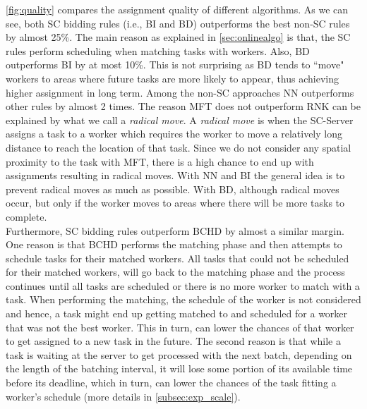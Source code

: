 \cref{fig:quality} compares the assignment quality of different algorithms. As we can see, both SC bidding rules (i.e., BI and BD) outperforms the best non-SC rules by almost 25\%. The main reason as explained in \cref{sec:onlinealgo} is that, the SC rules perform scheduling when matching tasks with workers. Also, BD outperforms BI by at most 10\%. This is not surprising as BD tends to ``move" workers to areas where future tasks are more likely to appear, thus achieving higher assignment in long term. Among the non-SC approaches NN outperforms other rules by almost 2 times. The reason MFT does not outperform RNK can be explained by what we call a \emph{radical move}. A \emph{radical move} is when the SC-Server assigns a task to a worker which requires the worker to move a relatively long distance to reach the location of that task. Since we do not consider any spatial proximity to the task with MFT, there is a high chance to end up with assignments resulting in radical moves. With NN and BI the general idea is to prevent radical moves as much as possible. With BD, although radical moves occur, but only if the worker moves to areas where there will be more tasks to complete.\\

Furthermore, SC bidding rules outperform BCHD by almost a similar margin. One reason is that BCHD performs the matching phase and then attempts to schedule tasks for their matched workers. All tasks that could not be scheduled for their matched workers, will go back to the matching phase and the process continues until all tasks are scheduled or there is no more worker to match with a task. When performing the matching, the schedule of the worker is not considered and hence, a task might end up getting matched to and scheduled for a worker that was not the best worker. This in turn, can lower the chances of that worker to get assigned to a new task in the future. The second reason is that while a task is waiting at the server to get processed with the next batch, depending on the length of the batching  interval, it will lose some portion of its available time before its deadline, which in turn, can lower the chances of the task fitting a worker's schedule (more details in \cref{subsec:exp_scale}).\\

